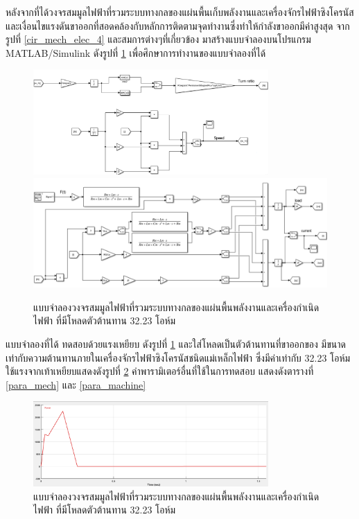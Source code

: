 \documentclass[11pt,a4paper]{article}
\begin{document}
หลังจากที่ได้วงจรสมมูลไฟฟ้าที่รวมระบบทางกลของแผ่นพื้นเก็บพลังงานและเครื่องจักรไฟฟ้าซิงโครนัสและเงื่อนไขแรงดันขาออกที่สอดคล้องกับหลักการติดตามจุดทำงานซึ่งทำให้กำลังขาออกมีค่าสูงสุด จากรูปที่ \ref{cir_mech_elec_4} และสมการต่างๆที่เกี่ยวข้อง มาสร้างแบบจำลองบนโปรแกรม MATLAB/Simulink ดังรูปที่ \ref{sim_elecmech} เพื่อศึกษาการทำงานของแบบจำลองที่ได้

\begin{figure}[H]
    \begin{center}
        \includegraphics[width=0.8\textwidth]{sim_elecmech_2.png}
        \includegraphics[width=1\textwidth]{sim_elecmech_3.png}
    \end{center}
    \caption{แบบจำลองวงจรสมมูลไฟฟ้าที่รวมระบบทางกลของแผ่นพื้นพลังงานและเครื่องกำเนิดไฟฟ้า ที่มีโหลดตัวต้านทาน 32.23 โอห์ม}
    \label{sim_elecmech}
\end{figure}

แบบจำลองที่ได้ ทดสอบด้วยแรงเหยียบ ดังรูปที่ \ref{sim_elecmech} และใส่โหลดเป็นตัวต้านทานที่ขาออกของ มีขนาดเท่ากับความต้านทานภายในเครื่องจักรไฟฟ้าซิงโครนัสชนิดแม่เหล็กไฟฟ้า ซึ่งมีค่าเท่ากับ 32.23 โอห์ม ใช้แรงจากเท้าเหยียบแสดงดังรูปที่ \ref{force_sim} ค่าพารามิเตอร์อื่นที่ใช้ในการทดสอบ \cite{GpH:01} แสดงดังตารางที่ \ref{para_mech} และ \ref{para_machine}
\begin{figure}[H]
    \begin{center}
        \includegraphics[width=0.8\textwidth]{force_sim.png}
    \end{center}
    \caption{แบบจำลองวงจรสมมูลไฟฟ้าที่รวมระบบทางกลของแผ่นพื้นพลังงานและเครื่องกำเนิดไฟฟ้า ที่มีโหลดตัวต้านทาน 32.23 โอห์ม}
    \label{force_sim}
\end{figure}
\end{document}
